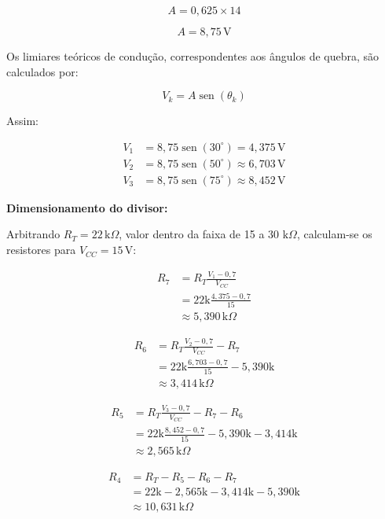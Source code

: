 \documentclass[11pt,a4paper]{article}
\begin{document}
\begin{itemize}
    \[
    A=0{,}625\times14
    \]

    \[
    \boxed{A=8{,}75\,\text{V}}
    \]

    Os limiares teóricos de condução, correspondentes aos ângulos
    de quebra, são calculados por:

    \[
    V_k=A\operatorname{sen}(\theta_k)
    \]

    Assim:

    \begin{align*}
        V_1&=8{,}75\operatorname{sen}(30^\circ)
        =4{,}375\,\text{V}\\
        V_2&=8{,}75\operatorname{sen}(50^\circ)
        \approx6{,}703\,\text{V}\\
        V_3&=8{,}75\operatorname{sen}(75^\circ)
        \approx8{,}452\,\text{V}
    \end{align*}

    \textbf{Dimensionamento do divisor:}

    Arbitrando $R_T=22\,\text{k}\Omega$, valor dentro da faixa
    de 15 a 30 $\text{k}\Omega$, calculam-se os resistores para
    $V_{CC}=15\,\text{V}$:

    \begin{align*}
        R_7&=R_T\frac{V_1-0{,}7}{V_{CC}}\\
        &=22\text{k}\frac{4{,}375-0{,}7}{15}\\
        &\approx5{,}390\,\text{k}\Omega
    \end{align*}

    \begin{align*}
        R_6&=R_T\frac{V_2-0{,}7}{V_{CC}}-R_7\\
        &=22\text{k}\frac{6{,}703-0{,}7}{15}-5{,}390\text{k}\\
        &\approx3{,}414\,\text{k}\Omega
    \end{align*}

    \begin{align*}
        R_5&=R_T\frac{V_3-0{,}7}{V_{CC}}-R_7-R_6\\
        &=22\text{k}\frac{8{,}452-0{,}7}{15}
        -5{,}390\text{k}-3{,}414\text{k}\\
        &\approx2{,}565\,\text{k}\Omega
    \end{align*}

    \begin{align*}
        R_4&=R_T-R_5-R_6-R_7\\
        &=22\text{k}-2{,}565\text{k}
        -3{,}414\text{k}-5{,}390\text{k}\\
        &\approx10{,}631\,\text{k}\Omega
    \end{align*}


\end{itemize}
\end{document}
